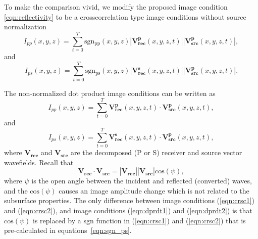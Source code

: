 \documentclass[manuscript,ulem,graphix,revised]{geophysics}
\begin{document}
To make the comparison vivid, we modify the proposed image condition \ref{eqn:reflectivity} to be a crosscorrelation type image conditions without source normalization
\begin{equation}
I_{pp}(x,y,z)=\sum_{t=0}^{T}\mathrm{sgn_{pp}}(x,y,z)|\mathbf{V^p_{rec}}(x,y,z,t)||\mathbf{V^p_{src}}(x,y,z,t)|,
\label{eqn:crsc1}
\end{equation}
and
\begin{equation}
I_{ps}(x,y,z)=\sum_{t=0}^{T}\mathrm{sgn_{ps}}(x,y,z)|\mathbf{V^s_{rec}}(x,y,z,t)||\mathbf{V^p_{src}}(x,y,z,t)|.
\label{eqn:crsc2}
\end{equation}

The non-normalized dot product image conditions can be written as
\begin{equation}
I_{pp}(x,y,z)=\sum_{t=0}^{T}\mathbf{V^p_{rec}}(x,y,z,t)\cdot \mathbf{V^p_{src}}(x,y,z,t),
\label{eqn:dprdt1}
\end{equation}
and
\begin{equation}
I_{ps}(x,y,z)=\sum_{t=0}^{T}\mathbf{V^s_{rec}}(x,y,z,t)\cdot \mathbf{V^p_{src}}(x,y,z,t),
\label{eqn:dprdt2}
\end{equation}
where $\mathbf{V_{rec}}$ and $\mathbf{V_{src}}$ are the decomposed (P or S) receiver and source vector wavefields. Recall that 
\begin{equation}
\mathbf{V_{rec}}\cdot \mathbf{V_{src}}=|\mathbf{V_{rec}}||\mathbf{V_{src}}|\mathrm{cos}(\psi),
\label{eqn:a3}
\end{equation}
where $\psi$ is the open angle between the incident and reflected (converted) waves, and the $\mathrm{cos}(\psi)$ causes an image amplitude change which is not related to the subsurface properties. The only difference between image conditions (\ref{eqn:crsc1}) and (\ref{eqn:crsc2}), and image conditions (\ref{eqn:dprdt1}) and (\ref{eqn:dprdt2}) is that $\mathrm{cos}(\psi)$ is replaced by a sgn function in (\ref{eqn:crsc1}) and (\ref{eqn:crsc2}) that is pre-calculated in equations~\ref{eqn:sgn_ps}.


\newpage


\end{document}

